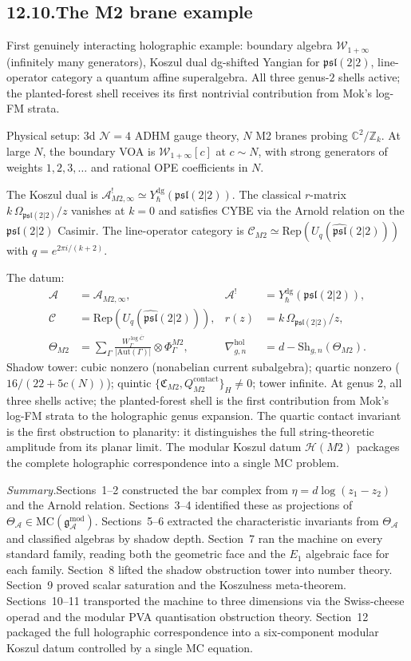 \documentclass[11pt,reqno]{amsart}
\theoremstyle{definition}
\theoremstyle{remark}
\providecommand{\cA}{\mathcal{A}}
\providecommand{\cC}{\mathcal{C}}
\providecommand{\cH}{\mathcal{H}}
\providecommand{\cN}{\mathcal{N}}
\providecommand{\cW}{\mathcal{W}}
\providecommand{\MC}{\mathrm{MC}}
\providecommand{\Aut}{\mathrm{Aut}}
\providecommand{\FM}{\overline{C}}
\providecommand{\gAmod}{\mathfrak{g}^{\mathrm{mod}}_\cA}
\providecommand{\hol}{\mathrm{hol}}
\providecommand{\bC}{\mathbb{C}}
\providecommand{\bZ}{\mathbb{Z}}
\providecommand{\Rep}{\mathrm{Rep}}
\providecommand{\dg}{\mathrm{dg}}
\providecommand{\contact}{\mathrm{contact}}
\numberwithin{equation}{section}
\begin{document}
\subsection*{12.10.\enspace The M2 brane example}

First genuinely interacting holographic example: boundary
algebra $\cW_{1+\infty}$ (infinitely many generators), Koszul
dual dg-shifted Yangian for $\mathfrak{psl}(2|2)$, line-operator
category a quantum affine superalgebra. All three genus-$2$
shells active; the planted-forest shell receives its first
nontrivial contribution from Mok's log-FM strata.

Physical setup: 3d $\cN = 4$ ADHM gauge theory, $N$ M2 branes
probing $\bC^2/\bZ_k$. At large $N$, the boundary VOA is
$\cW_{1+\infty}[c]$ at $c \sim N$, with strong generators of
weights $1, 2, 3, \ldots$ and rational OPE coefficients in $N$.

The Koszul dual is
$\cA^!_{M2,\infty} \simeq Y^{\dg}_\hbar(\mathfrak{psl}(2|2))$.
The classical $r$-matrix $k\,\Omega_{\mathfrak{psl}(2|2)}/z$
vanishes at $k = 0$ and satisfies CYBE via the Arnold relation
on the $\mathfrak{psl}(2|2)$ Casimir. The line-operator
category is
$\cC_{M2} \simeq \Rep(U_q(\widehat{\mathfrak{psl}}(2|2)))$
with $q = e^{2\pi i/(k+2)}$.

The datum:
\begin{align*}
\cA &= \cA_{M2,\infty},
 & \cA^! &= Y^{\dg}_\hbar(\mathfrak{psl}(2|2)),\\
\cC &= \Rep(U_q(\widehat{\mathfrak{psl}}(2|2))),
 & r(z) &= k\,\Omega_{\mathfrak{psl}(2|2)}/z,\\
\Theta_{M2} &= \sum_\Gamma
 \tfrac{W^{\log\FM}_\Gamma}{|\Aut(\Gamma)|}\otimes\Phi^{M2}_\Gamma,
 & \nabla^{\hol}_{g,n} &= d - \mathrm{Sh}_{g,n}(\Theta_{M2}).
\end{align*}
Shadow tower: cubic nonzero (nonabelian current subalgebra);
quartic nonzero ($16/(22 + 5c(N))$); quintic
$\{\mathfrak C_{M2}, Q^{\contact}_{M2}\}_H \neq 0$; tower
infinite. At genus $2$, all three shells active; the
planted-forest shell is the first contribution from Mok's
log-FM strata to the holographic genus expansion. The quartic
contact invariant is the first obstruction to planarity: it
distinguishes the full string-theoretic amplitude from its
planar limit. The modular Koszul datum $\cH(M2)$ packages the
complete holographic correspondence into a single MC problem.

\bigskip\noindent\emph{Summary.}\enspace Sections~1--2
constructed the bar complex from $\eta = d\log(z_1 - z_2)$ and
the Arnold relation. Sections~3--4 identified these as
projections of $\Theta_\cA \in \MC(\gAmod)$. Sections~5--6
extracted the characteristic invariants from $\Theta_\cA$ and
classified algebras by shadow depth. Section~7 ran the
machine on every standard family, reading both the geometric
face and the $E_1$ algebraic face for each family. Section~8
lifted the shadow obstruction tower into number theory.
Section~9 proved scalar saturation and the Koszulness
meta-theorem. Sections~10--11 transported the machine to
three dimensions via the Swiss-cheese operad and the modular
PVA quantisation obstruction theory. Section~12 packaged
the full holographic correspondence into a six-component
modular Koszul datum controlled by a single MC equation.
\end{document}
